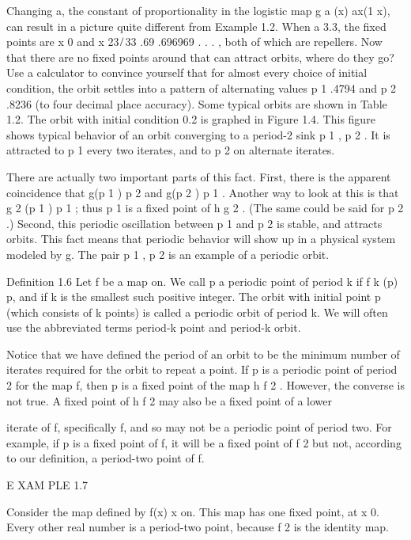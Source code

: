 \documentclass[12pt]{article}
\begin{document}
Changing a, the constant of proportionality in the logistic map g a (x)  ax(1  x), can result in a picture 
quite different from Example 1.2. When a  3.3, the ﬁxed points are x  0 and x  23 ̸ 33  .69  .696969 . . . 
, both of which are repellers. Now that there are no ﬁxed points around that can attract orbits, where do 
they go? Use a calculator to convince yourself that for almost every choice of initial condition, the orbit 
settles into a pattern of alternating values p 1  .4794 and p 2  .8236 (to four decimal place accuracy). 
Some typical orbits are shown in Table 1.2. The orbit with initial condition 0.2 is graphed in Figure 1.4. 
This ﬁgure shows typical behavior of an orbit converging to a period-2 sink p 1 , p 2  . It is attracted 
to p 1 every two iterates, and to p 2 on alternate iterates.

There are actually two important parts of this fact. First, there is the apparent coincidence that g(p 1 )  
p 2 and g(p 2 )  p 1 . Another way to look at this is that g 2 (p 1 )  p 1 ; thus p 1 is a ﬁxed point of h  
g 2 . (The same could be said for p 2 .) Second, this periodic oscillation between p 1 and p 2 is stable, 
and attracts orbits. This fact means that periodic behavior will show up in a physical system modeled by g. 
The pair p 1 , p 2  is an example of a periodic orbit.

Deﬁnition 1.6 Let f be a map on. We call p a periodic point of period k if f k (p)  p, and if k is the 
smallest such positive integer. The orbit with initial point p (which consists of k points) is called a 
periodic orbit of period k. We will often use the abbreviated terms period-k point and period-k orbit.

Notice that we have deﬁned the period of an orbit to be the minimum number of iterates required for the 
orbit to repeat a point. If p is a periodic point of period 2 for the map f, then p is a ﬁxed point of the 
map h  f 2 . However, the converse is not true. A ﬁxed point of h  f 2 may also be a ﬁxed point of a 
lower


iterate of f, speciﬁcally f, and so may not be a periodic point of period two. For example, if p is a 
ﬁxed point of f, it will be a ﬁxed point of f 2 but not, according to our deﬁnition, a period-two point 
of f.

E XAM PLE 1.7

Consider the map deﬁned by f(x)  x on. This map has one ﬁxed point, at x  0. Every other real number is a 
period-two point, because f 2 is the identity map.
\end{document}
